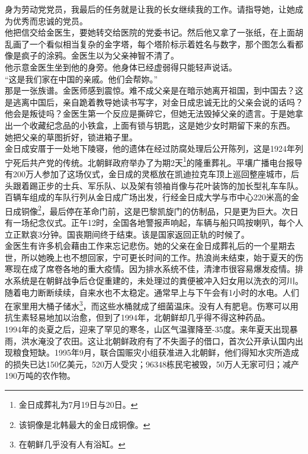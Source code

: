 身为劳动党党员，我最后的任务就是让我的长女继续我的工作。请指导她，让她成为优秀而忠诚的党员。\\

他把信交给金医生，要她转交给医院的党委书记。然后他又拿了一张纸，在上面胡乱画了一个看似相当复杂的金字塔，每个塔阶标示着姓名与数字，那个图怎么看都像是疯子的涂鸦。金医生以为父亲神智不清了。\\

他示意金医生坐到他的身旁。他身体已经虚弱得只能轻声说话。\\

“这是我们家在中国的亲戚。他们会帮妳。”\\

那是一张族谱。金医师感到震惊。难不成父亲是在暗示她离开祖国，到中国去？这是逃离中国后，亲自跪着教导她读书写字，对金日成忠诚无比的父亲会说的话吗？他会是叛徒吗？金医生第一个反应是撕碎它，但她无法毁掉父亲的遗言。于是她拿出一个收藏纪念品的小铁盒，上面有锁与钥匙，这是她少女时期留下来的东西。\\

她把父亲的草图折好，锁进箱子里。\\

金日成安厝于一处地下陵寝，他的遗体在经过防腐处理后公开陈列，这是1924年列宁死后共产党的传统。北朝鲜政府举办了为期2天\footnote{金日成葬礼为7月19日与20日。}的隆重葬礼。平壤广播电台报导有200万人参加了这场仪式，金日成的灵柩放在凯迪拉克车顶上巡回整座城市，后头跟着踢正步的士兵、军乐队、以及架有领袖肖像与花叶装饰的加长型礼车车队。百辆车组成的车队行列从金日成广场出发，行经金日成大学与市中心220米高的金日成铜像\footnote{该铜像是北韩最大的金日成铜像。}，最后停在革命门前，这是巴黎凯旋门的仿制品，只是更为巨大。次日有一场纪念仪式。正午12时，全国各地警报声响起，车辆与船只鸣按喇叭，每个人立正默哀3分钟。国丧期间终于结束。该是国家返回正轨的时候了。\\

金医生有许多机会藉由工作来忘记悲伤。她的父亲在金日成葬礼后的一个星期去世，所以她晚上也不想回家，宁可更长时间的工作。热浪尚未结束，始于夏天的伤寒现在成了席卷各地的重大疫情。因为排水系统不佳，清津市很容易爆发疫情。排水系统是在朝鲜战争后仓促重建的，未处理过的粪便被冲入妇女用以洗衣的河川。随着电力断断续续，自来水也不太稳定。通常早上与下午会有1小时的水电。人们在家里用大桶子储水\footnote{在朝鲜几乎没有人有浴缸。}，而这些水桶就成了细菌温床。没有人有肥皂。伤寒可以用抗生素轻易地加以治愈，但到了1994年，北朝鲜却几乎得不得这种药品。\\

1994年的炎夏之后，迎来了罕见的寒冬，山区气温骤降至-35度。来年夏天出现暴雨，洪水淹没了农田。这让北朝鲜政府有了不失面子的借口，首次公开承认国内出现粮食短缺。1995年9月，联合国赈灾小组获准进入北朝鲜，他们得知水灾所造成的损失已达150亿美元，520万人受灾；96348栋民宅被毁，50万人无家可归；减产190万吨的农作物。\\

